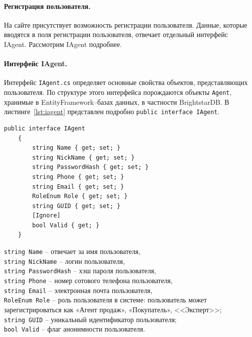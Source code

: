\documentclass[a4paper,14pt,openany,final]{extreport} %
\def\oldcaption{} \let\oldcaption=\caption
\def\caption{\stepcounter{captionsnum}\oldcaption}
\begin{document}
{\paragraph{Регистрация пользователя.}
На сайте присутствует возможность регистрации пользователя. Данные, которые вводятся в поля регистрации пользователя, отвечает отдельный интерфейс IAgent. Рассмотрим IAgent подробнее.

\paragraph{Интерфейс IAgent.}
Интерфейс \verb|IAgent.cs| определяет основные свойства объектов, представляющих пользователя. По структуре этого интерфейса порождаются объекты \verb|Agent|, хранимые в EntityFramework\;--\;базах данных, в частности BrightstarDB. В листинге~\ref{lst:iagent} представлен подробно \verb|public interface IAgent|.
\begin{pzlisting}
\caption{Интерфейс регистрации пользователя}\label{lst:iagent}
\begin{verbatim}
public interface IAgent
    {
        string Name { get; set; }
        string NickName { get; set; }
        string PasswordHash { get; set; }
        string Phone { get; set; }
        string Email { get; set; }
        RoleEnum Role { get; set; }
        string GUID { get; set; }
        [Ignore]
        bool Valid { get; }
    }
\end{verbatim}
\end{pzlisting}

\noindent\verb|string Name| – отвечает за имя пользователя,\\
\verb|string NickName| – логин пользователя,\\
\verb|string PasswordHash| – хэш пароля пользователя,\\
\verb|string Phone| – номер сотового телефона пользователя,\\
\verb|string Email| – электронная почта пользователя,\\
\verb|RoleEnum Role| – роль пользователя в системе: пользователь может зарегистрироваться как «Агент продаж», «Покупатель», <<Эксперт>>;\\
\verb|string GUID| – уникальный идентификатор пользователя;\\
\verb|bool Valid| – флаг анонимности пользователя.

}
\end{document}
